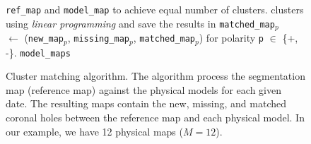 \begin{figure}[t!]
\begin{algorithmic}[1]
                \Statex \hspace{2.9cm} {\tt ref\_map} and {\tt model\_map} to
                \Statex \hspace{2.9cm} achieve equal number of clusters.
                 clusters using \textit{linear programming} 
                \Statex \hspace{2.9cm} and save the results in
                \Statex \hspace{2.9cm} {\tt matched\_map$_p$}                                                            
                \EndFor
                \Statex
                \State~
                 $\gets$  ({\tt new\_map$_p$}, 
                \Statex \hspace{2.2cm} {\tt missing\_map$_p$}, {\tt matched\_map$_p$})
                \Statex \hspace{2.2cm} for polarity {\tt p} $\in$ \{+, -\}.
                 {\tt model\_maps}
                \EndFor
                \EndFor     
                \EndFunction
        \end{algorithmic}
        \caption{Cluster matching algorithm. The algorithm process the segmentation map
                  (reference map) against the physical models for each given date. 
                  The resulting maps contain the new, missing, and matched coronal holes
                       between the reference map and each physical model.
                  In our example, we have 12 physical maps ($M=12$).     }
        \label{Fig:autoClassOverviewAlg}
      \end{figure} 

